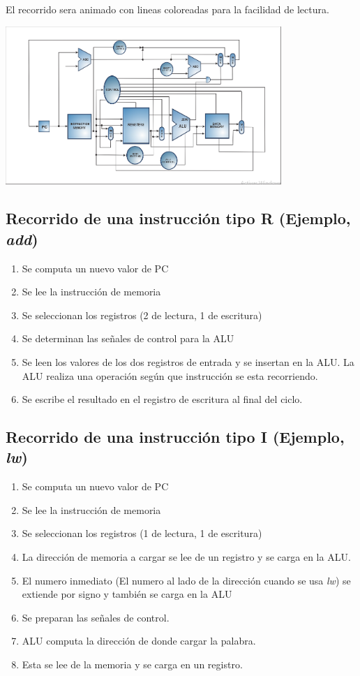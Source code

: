 \documentclass[titlepage]{article}
\begin{document}
El recorrido sera animado con lineas coloreadas para la facilidad de lectura.

\begin{center}
    \includegraphics[height=6cm]{images/step8.png} %
\end{center}

\subsection*{Recorrido de una instrucción tipo R (Ejemplo, \emph{add})}

\begin{enumerate}
    \item Se computa un nuevo valor de PC
    \item Se lee la instrucción de memoria
    \item Se seleccionan los registros (2 de lectura, 1 de escritura)
    \item Se determinan las señales de control para la ALU
    \item Se leen los valores de los dos registros de entrada y se insertan en la ALU. La ALU realiza una operación según que instrucción se esta recorriendo.
    \item Se escribe el resultado en el registro de escritura al final del ciclo.
\end{enumerate}

\subsection*{Recorrido de una instrucción tipo I (Ejemplo, \emph{lw})}

\begin{enumerate}
    \item Se computa un nuevo valor de PC
    \item Se lee la instrucción de memoria
    \item Se seleccionan los registros (1 de lectura, 1 de escritura)
    \item La dirección de memoria a cargar se lee de un registro y se carga en la ALU.
    \item El numero inmediato (El numero al lado de la dirección cuando se usa \emph{lw}) se extiende por signo y también se carga en la ALU
    \item Se preparan las señales de control.
    \item ALU computa la dirección de donde cargar la palabra.
    \item Esta se lee de la memoria y se carga en un registro.
\end{enumerate}
\end{document}
